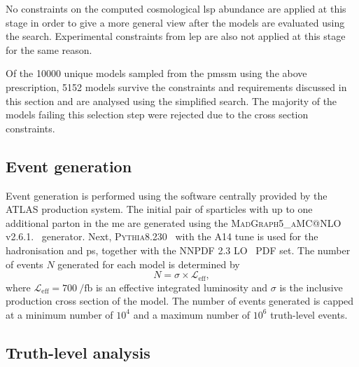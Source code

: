 No constraints on the computed cosmological \gls{lsp} abundance are applied at this stage in order to give a more general view after the models are evaluated using the \onelepton search. Experimental constraints from \eg \gls{lep} are also not applied at this stage for the same reason. 

Of the \num[group-separator={,}]{10000} unique models sampled from the \gls{pmssm} using the above prescription, \num[group-separator={,}]{5152} models survive the constraints and requirements discussed in this section and are analysed using the simplified \onelepton search. The majority of the models failing this selection step were rejected due to the cross section constraints.

\subsection{Event generation}

Event generation is performed using the software centrally provided by the ATLAS production system. The initial pair of sparticles with up to one additional parton in the \gls{me} are generated using the \textsc{MadGraph5\_aMC@NLO} v2.6.1.~\cite{MGaMCNLO:2014hca,Frederix:2012ps} generator. Next, \textsc{Pythia8.230}~\cite{Pythia8:2007gs}  with the \textsc{A14} tune is used for the hadronisation and \gls{ps}, together with the NNPDF 2.3 LO~\cite{Ball:2012cx} \gls{PDF} set. The number of events $N$ generated for each model is determined by
\begin{equation}
	N = \sigma \times \mathcal{L}_\mathrm{eff},
\end{equation}
where $\mathcal{L}_\mathrm{eff} = \SI{700}{\per\femto\barn}$ is an effective integrated luminosity and $\sigma$ is the inclusive production cross section of the model. The number of events generated is capped at a minimum number of $10^4$ and a maximum number of $10^6$ truth-level events.

\subsection{Truth-level analysis}

